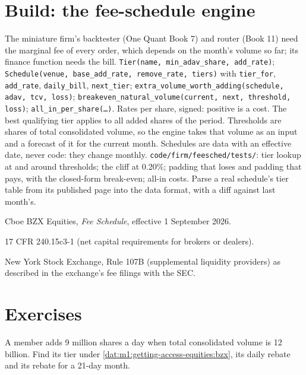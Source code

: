 \section{Build: the fee-schedule engine}\label{bld:m1:getting-access-equities:feesched}

\begin{build}
 The miniature firm's backtester (One Quant Book 7) and
router (Book 11) need the marginal fee of every order, which depends on the
month's volume so far; its finance function needs the bill.
 \texttt{Tier(name, min\_adav\_share, add\_rate)};
\texttt{Schedule(venue, base\_add\_rate, remove\_rate, tiers)} with
\texttt{tier\_for}, \texttt{add\_rate}, \texttt{daily\_bill},
\texttt{next\_tier}; \texttt{extra\_volume\_worth\_adding(schedule, adav, tcv,
loss)}; \texttt{breakeven\_natural\_volume(current, next, threshold, loss)};
\texttt{all\_in\_per\_share(\ldots)}.
 Rates per share, signed: positive is a cost. The best
qualifying tier applies to all added shares of the period. Thresholds are
shares of total consolidated volume, so the engine takes that volume as an
input and a forecast of it for the current month. Schedules are data with an
effective date, never code: they change monthly.
 \texttt{code/firm/feesched/tests/}: tier lookup at
and around thresholds; the cliff at 0.20\%; padding that loses and padding
that pays, with the closed-form break-even; all-in costs.
 Parse a real schedule's tier table from its published
page into the data format, with a diff against last month's.
\end{build}

\begin{omsources}
\item Cboe BZX Equities, \emph{Fee Schedule}, effective 1 September 2026.
\item 17 CFR 240.15c3-1 (net capital requirements for brokers or dealers).
\item New York Stock Exchange, Rule 107B (supplemental liquidity providers)
as described in the exchange's fee filings with the SEC.
\end{omsources}

\section{Exercises}

\begin{exercise}[$\star$]\label{exo:m1:getting-access-equities:1}
A member adds 9 million shares a day when total consolidated volume is 12
billion. Find its tier under \cref{dat:m1:getting-access-equities:bzx}, its
daily rebate and its rebate for a 21-day month.
\end{exercise}

